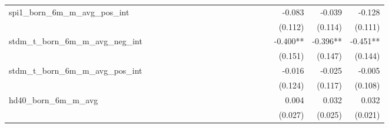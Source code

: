 \begin{tabular}{lrrrrrrrrrrrrrrrrrr}
spi1\_born\_6m\_m\_avg\_pos\_int            &             &             &             &             &             &             &             &             &             &             &             &             &             &             &             &      -0.083 &      -0.039 &      -0.128 \\ 
                                            &             &             &             &             &             &             &             &             &             &             &             &             &             &             &             &     (0.112) &     (0.114) &     (0.111) \\ 
stdm\_t\_born\_6m\_m\_avg\_neg\_int         &             &             &             &             &             &             &             &             &             &             &             &             &             &             &             &    -0.400** &    -0.396** &    -0.451** \\ 
                                            &             &             &             &             &             &             &             &             &             &             &             &             &             &             &             &     (0.151) &     (0.147) &     (0.144) \\ 
stdm\_t\_born\_6m\_m\_avg\_pos\_int         &             &             &             &             &             &             &             &             &             &             &             &             &             &             &             &      -0.016 &      -0.025 &      -0.005 \\ 
                                            &             &             &             &             &             &             &             &             &             &             &             &             &             &             &             &     (0.124) &     (0.117) &     (0.108) \\ 
hd40\_born\_6m\_m\_avg                      &             &             &             &             &             &             &             &             &             &             &             &             &             &             &             &       0.004 &       0.032 &       0.032 \\ 
                                            &             &             &             &             &             &             &             &             &             &             &             &             &             &             &             &     (0.027) &     (0.025) &     (0.021) \\ 

\end{tabular}
